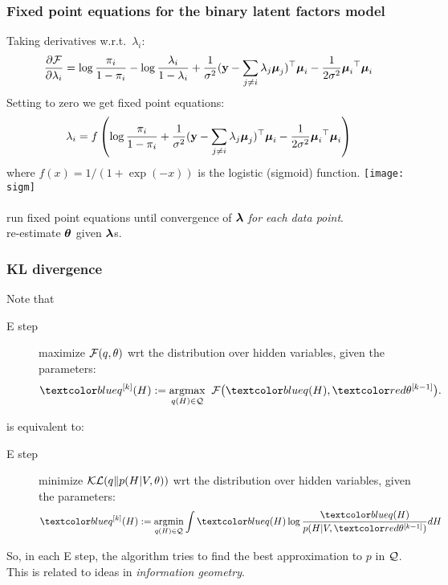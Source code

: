 \begin{frame}
\frametitle{Fixed point equations for the binary latent factors model}

Taking derivatives w.r.t.\ $\lambda_i$:
\[
\frac{\partial \cal F}{\partial \lambda_i} = \log \frac{\pi_i}{1-\pi_i} - \log
\frac{\lambda_i}{1-\lambda_i} + \frac{1}{\sigma^2} (\mathbf y - \sum_{j\neq
i} \lambda_j {\boldsymbol{\mu}}_j){\scriptsize^{\top}} {\boldsymbol{\mu}}_i  - \frac{1}{2\sigma^2} {\boldsymbol{\mu}}_i{\scriptsize^{\top}} {\boldsymbol{\mu}}_i
\]
Setting to zero we get fixed point equations:
\[
\lambda_i = f \left( \log \frac{\pi_i}{1-\pi_i} + \frac{1}{\sigma^2}
(\mathbf y - \sum_{j\neq i} \lambda_j {\boldsymbol{\mu}}_j){\scriptsize^{\top}} {\boldsymbol{\mu}}_i  -
\frac{1}{2\sigma^2} {\boldsymbol{\mu}}_i{\scriptsize^{\top}} {\boldsymbol{\mu}}_i \right)  
\]
where $f(x) = 1/(1+\exp(-x))$ is the logistic (sigmoid)
function. \texttt{[image: sigm]} \\[1ex]

 \\[1ex]
 run fixed point equations until convergence of
$\boldsymbol{\lambda}$ {\em for each data point}. \\
 re-estimate $\boldsymbol{\theta}$ given $\boldsymbol{\lambda}$s.


\end{frame}
\begin{frame}
\frametitle{KL divergence}

Note that 
\begin{description}
\item[E step]
maximize ${\cal F}(q,\theta)$ wrt the distribution over hidden
variables, given the parameters:
\begin{equation*}
\Blue{q^{[k]}(H)}:=\underset{q(H)\in {\cal Q}}{\argmax}\;\;{\cal
F}\big(\Blue{q(H)},\Red{\theta^{[k-1]}}\big).
\end{equation*}
\end{description}
is equivalent to:
\begin{description}
\item[E step]
minimize ${\cal KL}(q \| p(H|V,\theta))$ wrt the distribution over
hidden variables, given the parameters:
\begin{equation*}
\Blue{q^{[k]}(H)}:=\underset{q(H)\in {\cal Q}}{\argmin} \int \Blue{q(H)} \log
\frac{\Blue{q(H)}}{p(H|V,\Red{\theta^{[k-1]}})} dH
\end{equation*}
\end{description}


So, in each E step, the algorithm tries to find
the best approximation to $p$ in ${\cal Q}$. \\[1ex]

This is related to ideas in {\em information geometry}.

\end{frame}
